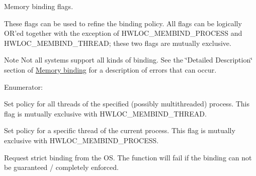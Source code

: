 Memory binding flags. 

These flags can be used to refine the binding policy. All flags can be logically OR'ed together with the exception of HWLOC\_\-MEMBIND\_\-PROCESS and HWLOC\_\-MEMBIND\_\-THREAD; these two flags are mutually exclusive.

\begin{DoxyNote}{Note}
Not all systems support all kinds of binding. See the \char`\"{}Detailed Description\char`\"{} section of \hyperlink{a00050}{Memory binding} for a description of errors that can occur. 
\end{DoxyNote}
\begin{Desc}
\item[Enumerator: ]\par
\begin{description}
\item[{\em 
\hypertarget{a00050_ggab00475fd98815bf4fb9aaf752030e7d2a1b1b74aef138f64aff214a8cbdfe8eb4}{
HWLOC\_\-MEMBIND\_\-PROCESS}
\label{a00050_ggab00475fd98815bf4fb9aaf752030e7d2a1b1b74aef138f64aff214a8cbdfe8eb4}
}]Set policy for all threads of the specified (possibly multithreaded) process. This flag is mutually exclusive with HWLOC\_\-MEMBIND\_\-THREAD. \item[{\em 
\hypertarget{a00050_ggab00475fd98815bf4fb9aaf752030e7d2a1dc7dd5cdcd5796893a325a524555298}{
HWLOC\_\-MEMBIND\_\-THREAD}
\label{a00050_ggab00475fd98815bf4fb9aaf752030e7d2a1dc7dd5cdcd5796893a325a524555298}
}]Set policy for a specific thread of the current process. This flag is mutually exclusive with HWLOC\_\-MEMBIND\_\-PROCESS. \item[{\em 
\hypertarget{a00050_ggab00475fd98815bf4fb9aaf752030e7d2a0335311a0ee04166df2888d52b4a42c6}{
HWLOC\_\-MEMBIND\_\-STRICT}
\label{a00050_ggab00475fd98815bf4fb9aaf752030e7d2a0335311a0ee04166df2888d52b4a42c6}
}]Request strict binding from the OS. The function will fail if the binding can not be guaranteed / completely enforced.


\end{description}
\end{Desc}
